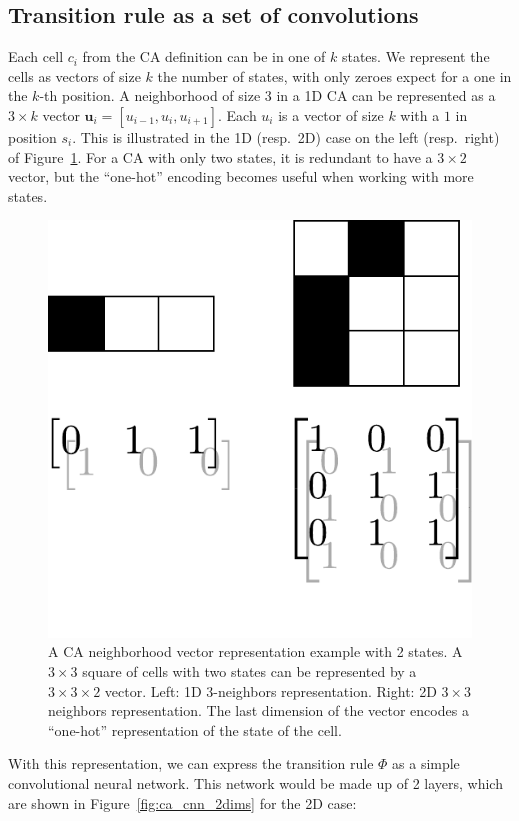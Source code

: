\subsection{Transition rule as a set of convolutions\label{sec:transition-rule-as}}

Each cell $c_i$ from the \ac{CA} definition can be in one of $k$ states. We
represent the cells as vectors of size $k$ the number of states, with only
zeroes expect for a one in the $k$-th position. A neighborhood of size $3$ in a
1D CA can be represented as a $3 \times k$ vector
$\mathbf{u}_i = [u_{i-1}, u_{i}, u_{i+1}]$. Each $u_{i}$ is a vector of size $k$
with a $1$ in position $s_i$. This is illustrated in the 1D (resp.\ 2D) case on
the left (resp.\ right) of Figure~\ref{fig:cell}. For a CA with only two states,
it is redundant to have a $3 \times 2$ vector, but the ``one-hot'' encoding
becomes useful when working with more states.

\begin{figure}[htbp]
  \centering
  \includegraphics[width=.4\linewidth]{figures/repr}
  \caption{\label{fig:cell}A \ac{CA} neighborhood vector representation example
    with 2 states. A $3\times 3$ square of cells with two states can be represented
    by a $3\times 3 \times 2$ vector. Left: 1D 3-neighbors representation. Right: 2D $3\times3$
    neighbors representation. The last dimension of the vector encodes a
    ``one-hot'' representation of the state of the cell.}

\end{figure}

With this representation, we can express the transition rule $\Phi$ as a simple
convolutional neural network. This network would be made up of 2 layers, which
are shown in Figure~\ref{fig:ca_cnn_2dims} for the 2D case:

